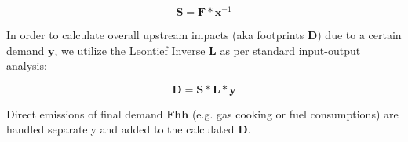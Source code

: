 \begin{equation}
\textbf{S} = \textbf{F} * \textbf{x}^{-1}
\end{equation}

In order to calculate overall upstream impacts (aka footprints $\textbf{D}$) due to a certain demand $\textbf{y}$, we utilize the Leontief Inverse $\textbf{L}$ as per standard input-output analysis:

\begin{equation}
\textbf{D} = \textbf{S} * \textbf{L} * \textbf{y}
\end{equation}

Direct emissions of final demand $\textbf{Fhh}$ (e.g. gas cooking or fuel consumptions) are handled separately and added to the calculated $\textbf{D}$.

    